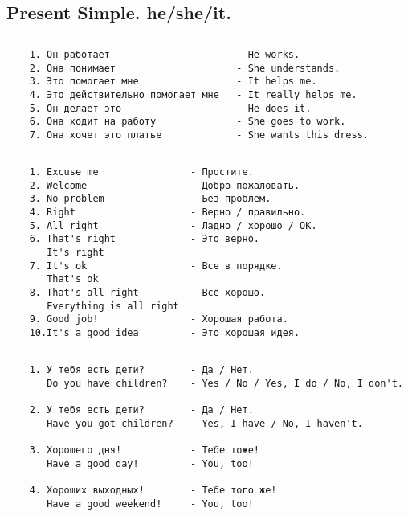 \subsection{Present Simple. he/she/it.}
\subsection*{}
\begin{verbatim}
    1. Он работает                      - He works.
    2. Она понимает                     - She understands.
    3. Это помогает мне                 - It helps me.
    4. Это действительно помогает мне   - It really helps me.
    5. Он делает это                    - He does it.
    6. Она ходит на работу              - She goes to work.
    7. Она хочет это платье             - She wants this dress.
\end{verbatim}

\subsection*{}
\begin{verbatim}
    1. Excuse me                - Простите.
    2. Welcome                  - Добро пожаловать.
    3. No problem               - Без проблем.
    4. Right                    - Верно / правильно.
    5. All right                - Ладно / хорошо / ОК.
    6. That's right             - Это верно.
       It's right
    7. It's ok                  - Все в порядке.
       That's ok
    8. That's all right         - Всё хорошо.
       Everything is all right
    9. Good job!                - Хорошая работа.
    10.It's a good idea         - Это хорошая идея.
\end{verbatim}

\subsection*{}
\begin{verbatim}
    1. У тебя есть дети?        - Да / Нет.
       Do you have children?    - Yes / No / Yes, I do / No, I don't.
    
    2. У тебя есть дети?        - Да / Нет.
       Have you got children?   - Yes, I have / No, I haven't.
    
    3. Хорошего дня!            - Тебе тоже!
       Have a good day!         - You, too!

    4. Хороших выходных!        - Тебе того же!
       Have a good weekend!     - You, too!
\end{verbatim}

